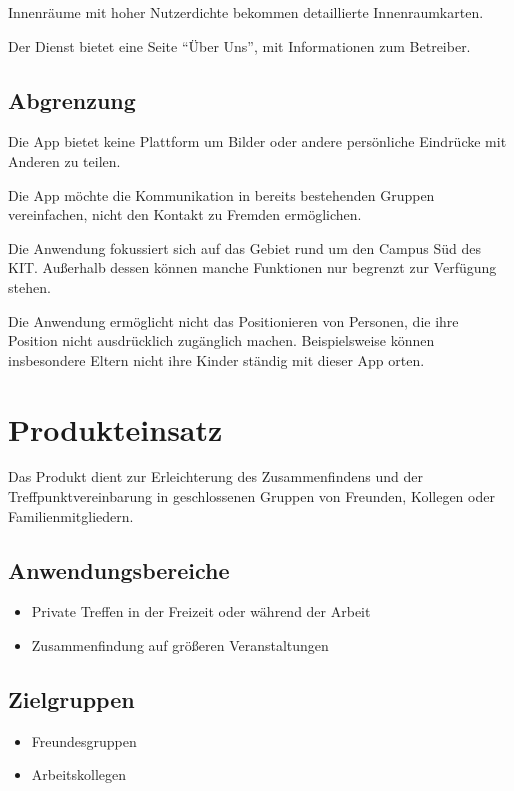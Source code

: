 \documentclass[parskip=full,11pt]{scrartcl}
\begin{document}
Innenräume mit hoher Nutzerdichte bekommen detaillierte Innenraumkarten.

Der Dienst bietet eine Seite \enquote{Über Uns},
mit Informationen zum Betreiber.

\subsection{Abgrenzung}
Die App bietet keine Plattform um Bilder oder andere persönliche Eindrücke mit Anderen zu teilen.

Die App möchte die Kommunikation in bereits bestehenden Gruppen vereinfachen, nicht den Kontakt zu Fremden ermöglichen.

Die Anwendung fokussiert sich auf das Gebiet rund um den Campus Süd des KIT.
Außerhalb dessen können manche Funktionen nur begrenzt zur Verfügung stehen.

Die Anwendung ermöglicht nicht das Positionieren von Personen, die ihre Position nicht ausdrücklich
zugänglich machen. Beispielsweise können insbesondere Eltern nicht ihre Kinder ständig mit dieser App orten.

\pagebreak
\section{Produkteinsatz}
Das Produkt dient zur Erleichterung des Zusammenfindens und der
Treffpunktvereinbarung in geschlossenen Gruppen von Freunden, Kollegen oder
Familienmitgliedern.

\subsection{Anwendungsbereiche}
\begin{itemize}
    \item Private Treffen in der Freizeit oder während der Arbeit
    \item Zusammenfindung auf größeren Veranstaltungen
\end{itemize}

\subsection{Zielgruppen}
\begin{itemize}
    \item Freundesgruppen
    \item Arbeitskollegen
\end{itemize}
\end{document}
